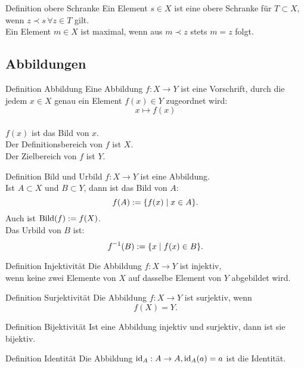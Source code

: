 \documentclass[main.tex]{subfiles}
\begin{document}
\begin{karte}{Definition obere Schranke}
    Ein Element \( s \in X \) ist eine obere Schranke für 
    \( T \subset X \), wenn \( z \prec s \,\forall z \in T \) 
    gilt.\\
    Ein Element \( m \in X \) ist maximal, wenn aus 
    \( m \prec z \) stets \( m = z \) folgt.
\end{karte}
\subsection*{Abbildungen}
\begin{karte}{Definition Abbildung}
    Eine Abbildung \(f : X \rightarrow Y\) ist eine Vorschrift, 
    durch die jedem \(x \in X \) genau ein Element \(f(x) \in Y\)
    zugeordnet wird:
    \[ x \mapsto f(x)\] \\
    \( f(x) \) ist das Bild von \(x\). \\
    Der Definitionsbereich von \(f\) ist \(X\). \\
    Der Zielbereich von \(f\) ist \(Y\). 
\end{karte}
\begin{karte}{Definition Bild und Urbild}
    \( f : X \rightarrow Y \) ist eine Abbildung. \\
    Ist \(A \subset X\) und \(B \subset Y\), 
    dann ist das Bild von \(A\):
    \[ f(A) := \{ f(x) \;\vert \; x \in A \}. \]
    Auch ist \( \operatorname{Bild}(f) := f(X)\). \\
    Das Urbild von \(B\) ist: 
    \[ \inverse{f}(B) := \set{x \;\vert \; f(x) \in B}. \]
\end{karte}
\begin{karte}{Definition Injektivität}
    Die Abbildung \(f: X \rightarrow Y\) ist injektiv, \\
    wenn keine zwei Elemente von \(X\) auf dasselbe 
    Element von \(Y\) abgebildet wird. 
\end{karte}
\begin{karte}{Definition Surjektivität}
    Die Abbildung \(f: X \rightarrow Y\) ist surjektiv, 
    wenn
    \[ f(X) = Y. \]
\end{karte} 
\begin{karte}{Definition Bijektivität}
    Ist eine Abbildung injektiv und surjektiv, 
    dann ist sie bijektiv. 
\end{karte}
\begin{karte}{Definition Identität}
    Die Abbildung \( \operatorname{id}_A : A \rightarrow A, 
    \operatorname{id}_A(a) = a\) ist die Identität.
\end{karte}
\end{document}
